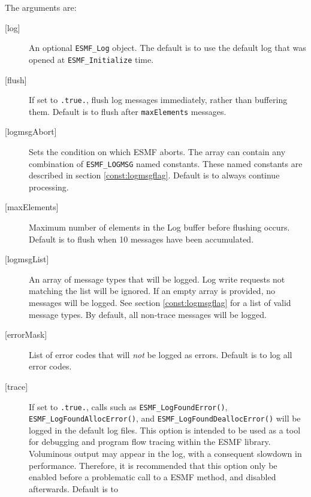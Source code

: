         The arguments are:
        \begin{description}
  
        \item [{[log]}]
              An optional {\tt ESMF\_Log} object.  The default is to use the
              default log that was opened at {\tt ESMF\_Initialize} time.
        \item [{[flush]}]
              If set to {\tt .true.}, flush log messages immediately, rather
              than buffering them.  Default is to flush after {\tt maxElements}
              messages.
        \item [{[logmsgAbort]}]
              Sets the condition on which ESMF aborts.  The array
              can contain any combination of {\tt ESMF\_LOGMSG} named constants.  These
              named constants are described in section \ref{const:logmsgflag}.
              Default is to always continue processing.
        \item [{[maxElements]}]
              Maximum number of elements in the Log buffer before flushing occurs.
              Default is to flush when 10 messages have been accumulated.
        \item [{[logmsgList]}]
              An array of message types that will be logged.  Log write requests
              not matching the list will be ignored.  If an empty array is
              provided, no messages will be logged.
              See section \ref{const:logmsgflag} for a list of
              valid message types.  By default, all non-trace messages will be
              logged.
        \item [{[errorMask]}]
              List of error codes that will {\em not} be logged as errors.
              Default is to log all error codes.
        \item [{[trace]}]
              \begin{sloppypar}
              If set to {\tt .true.}, calls such as {\tt ESMF\_LogFoundError()},
              {\tt ESMF\_LogFoundAllocError()}, and
              {\tt ESMF\_LogFoundDeallocError()}
              will be logged in the default log files.  This option is intended
              to be used as a tool for debugging and program flow tracing
              within the ESMF library. Voluminous output may appear in the log,
              with a consequent slowdown in performance.  Therefore, it is
              recommended that this option only be enabled before a problematic
              call to a ESMF method, and disabled afterwards. Default is to

\end{sloppypar}
\end{description}
